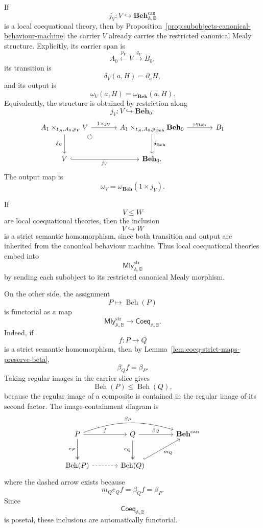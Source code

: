 If
\[
    j_V:V\hookrightarrow
    \mathbf{Beh}^{\mathrm{can}}_{\mathbb A,\mathbb B}
\]
is a local coequational theory, then by
Proposition~\ref{prop:subobjects-canonical-behaviour-machine} the carrier
\(V\) already carries the restricted canonical Mealy structure. Explicitly,
its carrier span is
\[
    A_0
        \xleftarrow{p_V}
    V
        \xrightarrow{q_V}
    B_0,
\]
its transition is
\[
    \delta_V(a,H)=\partial_aH,
\]
and its output is
\[
    \omega_V(a,H)=\omega_{\mathbf{Beh}}(a,H).
\]
Equivalently, the structure is obtained by restriction along
\[
    j_V:V\hookrightarrow\mathbf{Beh}_0:
\]
\[
\begin{tikzcd}[column sep=large, row sep=large]
    A_1\times_{t_A,A_0,p_V}V
        \arrow[r, "{1\times j_V}"]
        \arrow[d, "\delta_V"']
        \arrow[dr, phantom, "\circlearrowleft", very near start]
    &
    A_1\times_{t_A,A_0,p_{\mathbf{Beh}}}\mathbf{Beh}_0
        \arrow[d, "\delta_{\mathbf{Beh}}"]
        \arrow[r, "\omega_{\mathbf{Beh}}"]
    &
    B_1
    \\
    V
        \arrow[r, hook, "j_V"']
    &
    \mathbf{Beh}_0 .
\end{tikzcd}
\]
The output map is
\[
    \omega_V
    =
    \omega_{\mathbf{Beh}}(1\times j_V).
\]

If
\[
    V\leq W
\]
are local coequational theories, then the inclusion
\[
    V\hookrightarrow W
\]
is a strict semantic homomorphism, since both transition and output are
inherited from the canonical behaviour machine. Thus local coequational
theories embed into
\[
    \mathsf{Mly}^{\mathrm{str}}_{\mathbb A,\mathbb B}
\]
by sending each subobject to its restricted canonical Mealy morphism.

On the other side, the assignment
\[
    P\longmapsto \operatorname{Beh}(P)
\]
is functorial as a map
\[
    \mathsf{Mly}^{\mathrm{str}}_{\mathbb A,\mathbb B}
    \longrightarrow
    \mathsf{Coeq}_{\mathbb A,\mathbb B}.
\]
Indeed, if
\[
    f:P\to Q
\]
is a strict semantic homomorphism, then by
Lemma~\ref{lem:coeq-strict-maps-preserve-beta},
\[
    \beta_Qf=\beta_P.
\]
Taking regular images in the carrier slice gives
\[
    \operatorname{Beh}(P)\leq\operatorname{Beh}(Q),
\]
because the regular image of a composite is contained in the regular image of
its second factor. The image-containment diagram is
\[
\begin{tikzcd}[column sep=large, row sep=large]
    P
        \arrow[r, "f"]
        \arrow[d, two heads, "e_P"']
        \arrow[rr, bend left=18, "\beta_P"]
    &
    Q
        \arrow[r, "\beta_Q"]
        \arrow[d, two heads, "e_Q"']
    &
    \mathbf{Beh}^{\mathrm{can}}
    \\
    \operatorname{Beh}(P)
        \arrow[r, dashed]
    &
    \operatorname{Beh}(Q)
        \arrow[ur, hook, "m_Q"']
    &
\end{tikzcd}
\]
where the dashed arrow exists because
\[
    m_Qe_Qf=\beta_Qf=\beta_P.
\]
Since
\[
    \mathsf{Coeq}_{\mathbb A,\mathbb B}
\]
is posetal, these inclusions are automatically functorial.

